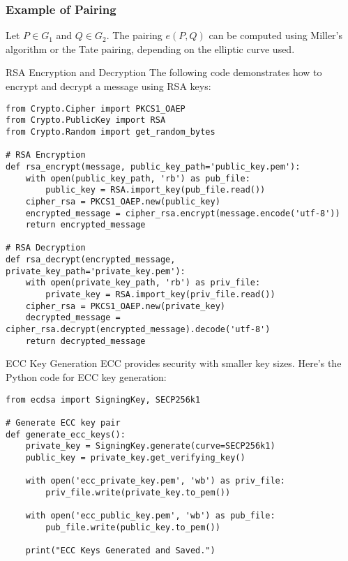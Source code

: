 \documentclass{beamer}
\begin{document}
\begin{frame}
    \frametitle{Example of Pairing}
    Let \( P \in G_1 \) and \( Q \in G_2 \). The pairing \( e(P, Q) \) can be computed using Miller's algorithm or the Tate pairing, depending on the elliptic curve used.
\end{frame}


\begin{frame}[fragile]{RSA Encryption and Decryption}
    The following code demonstrates how to encrypt and decrypt a message using RSA keys:
    \begin{lstlisting}
from Crypto.Cipher import PKCS1_OAEP
from Crypto.PublicKey import RSA
from Crypto.Random import get_random_bytes

# RSA Encryption
def rsa_encrypt(message, public_key_path='public_key.pem'):
    with open(public_key_path, 'rb') as pub_file:
        public_key = RSA.import_key(pub_file.read())
    cipher_rsa = PKCS1_OAEP.new(public_key)
    encrypted_message = cipher_rsa.encrypt(message.encode('utf-8'))
    return encrypted_message

# RSA Decryption
def rsa_decrypt(encrypted_message, private_key_path='private_key.pem'):
    with open(private_key_path, 'rb') as priv_file:
        private_key = RSA.import_key(priv_file.read())
    cipher_rsa = PKCS1_OAEP.new(private_key)
    decrypted_message = cipher_rsa.decrypt(encrypted_message).decode('utf-8')
    return decrypted_message
    \end{lstlisting}
\end{frame}

\begin{frame}[fragile]{ECC Key Generation}
    ECC provides security with smaller key sizes. Here's the Python code for ECC key generation:
    \begin{lstlisting}
from ecdsa import SigningKey, SECP256k1

# Generate ECC key pair
def generate_ecc_keys():
    private_key = SigningKey.generate(curve=SECP256k1)
    public_key = private_key.get_verifying_key()

    with open('ecc_private_key.pem', 'wb') as priv_file:
        priv_file.write(private_key.to_pem())

    with open('ecc_public_key.pem', 'wb') as pub_file:
        pub_file.write(public_key.to_pem())

    print("ECC Keys Generated and Saved.")
    \end{lstlisting}
\end{frame}
\end{document}
